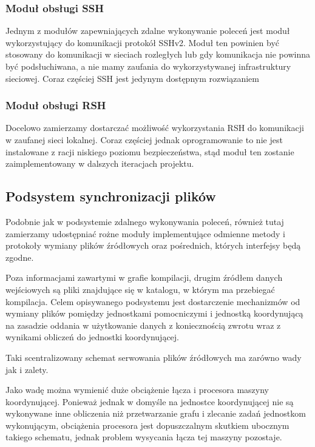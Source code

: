 \documentclass[a4paper]{article}
\begin{document}
\subsubsection{Moduł obsługi SSH}

Jednym z modułów zapewniających zdalne wykonywanie poleceń jest moduł wykorzystujący do komunikacji protokół SSHv2.
Moduł ten powinien być stosowany do komunikacji w sieciach rozległych lub gdy komunikacja nie powinna być podsłuchiwana, a nie mamy zaufania do wykorzystywanej infrastruktury sieciowej.
Coraz częściej SSH jest jedynym dostępnym rozwiązaniem 

\subsubsection{Moduł obsługi RSH}

Docelowo zamierzamy dostarczać możliwość wykorzystania RSH do komunikacji w zaufanej sieci lokalnej.
Coraz częściej jednak oprogramowanie to nie jest instalowane z racji niskiego poziomu bezpieczeństwa, stąd moduł ten zostanie zaimplementowany w dalszych iteracjach projektu.

\subsection{Podsystem synchronizacji plików}

Podobnie jak w podsystemie zdalnego wykonywania poleceń, również tutaj zamierzamy udostępniać rożne moduły implementujące odmienne metody i protokoły wymiany plików źródłowych oraz pośrednich, których interfejsy będą zgodne.

Poza informacjami zawartymi w grafie kompilacji, drugim źródłem danych wejściowych są pliki znajdujące się w katalogu, w którym ma przebiegać kompilacja.
Celem opisywanego podsystemu jest dostarczenie mechanizmów od wymiany plików pomiędzy jednostkami pomocniczymi i jednostką koordynującą na zasadzie oddania w użytkowanie danych z koniecznością zwrotu wraz z wynikami obliczeń do jednostki koordynującej.

Taki scentralizowany schemat serwowania plików źródłowych ma zarówno wady jak i zalety.

Jako wadę można wymienić duże obciążenie łącza i procesora maszyny koordynującej.
Ponieważ jednak w domyśle na jednostce koordynującej nie są wykonywane inne obliczenia niż przetwarzanie grafu i zlecanie zadań jednostkom wykonującym, obciążenia procesora jest dopuszczalnym skutkiem ubocznym takiego schematu, jednak problem wysycania łącza tej maszyny pozostaje.
\end{document}
